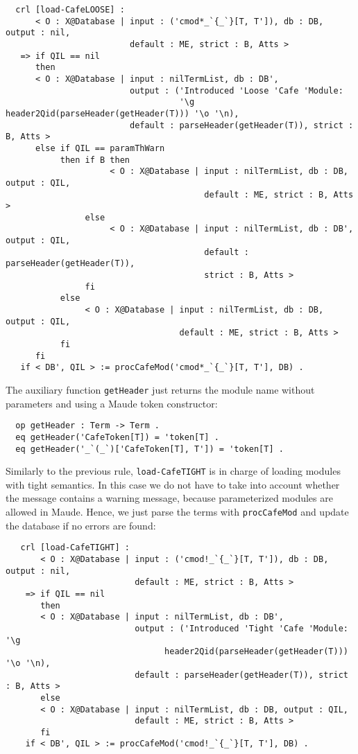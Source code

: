{\codesize
\begin{verbatim}
  crl [load-CafeLOOSE] :
      < O : X@Database | input : ('cmod*_`{_`}[T, T']), db : DB, output : nil,
                         default : ME, strict : B, Atts >
   => if QIL == nil
      then
      < O : X@Database | input : nilTermList, db : DB',
                         output : ('Introduced 'Loose 'Cafe 'Module:
                                   '\g header2Qid(parseHeader(getHeader(T))) '\o '\n),
                         default : parseHeader(getHeader(T)), strict : B, Atts >
      else if QIL == paramThWarn
           then if B then
                     < O : X@Database | input : nilTermList, db : DB, output : QIL,
                                        default : ME, strict : B, Atts >
                else
                     < O : X@Database | input : nilTermList, db : DB', output : QIL,
                                        default : parseHeader(getHeader(T)),
                                        strict : B, Atts >
                fi
           else
                < O : X@Database | input : nilTermList, db : DB, output : QIL,
                                   default : ME, strict : B, Atts >
           fi
      fi
   if < DB', QIL > := procCafeMod('cmod*_`{_`}[T, T'], DB) .
\end{verbatim}
}

The auxiliary function \verb"getHeader" just returns the module name without parameters
and using a Maude token constructor:

{\codesize
\begin{verbatim}
  op getHeader : Term -> Term .
  eq getHeader('CafeToken[T]) = 'token[T] .
  eq getHeader('_`(_`)['CafeToken[T], T']) = 'token[T] .
\end{verbatim}
}

Similarly to the previous rule, \verb"load-CafeTIGHT" is in charge of loading modules
with tight semantics. In this case we do not have to take into account whether the
message contains a warning message, because parameterized modules are allowed in Maude.
Hence, we just parse the terms with \verb"procCafeMod" and update the database if no
errors are found:

{\codesize
\begin{verbatim}
   crl [load-CafeTIGHT] :
       < O : X@Database | input : ('cmod!_`{_`}[T, T']), db : DB, output : nil,
                          default : ME, strict : B, Atts >
    => if QIL == nil
       then
       < O : X@Database | input : nilTermList, db : DB',
                          output : ('Introduced 'Tight 'Cafe 'Module: '\g
                                header2Qid(parseHeader(getHeader(T))) '\o '\n),
                          default : parseHeader(getHeader(T)), strict : B, Atts >
       else
       < O : X@Database | input : nilTermList, db : DB, output : QIL,
                          default : ME, strict : B, Atts >
       fi
    if < DB', QIL > := procCafeMod('cmod!_`{_`}[T, T'], DB) .
\end{verbatim}
}

